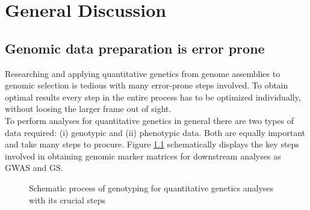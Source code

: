 \chapter{General Discussion} %
\label{Chapter6}
\section{Genomic data preparation is error prone}

Researching and applying quantitative genetics from genome assemblies to genomic selection
is tedious with many error-prone steps involved. To obtain optimal results every step in
the entire process has to be optimized individually, without loosing the larger frame out
of sight. \\
To perform analyses for quantitative genetics in general there are two types of data
required: (i) genotypic and (ii) phenotypic data. Both are equally important and take many
steps to procure. Figure \ref{fig:quan_flow} schematically displays the key steps involved
in obtaining genomic marker matrices for downstream analyses as GWAS and GS. 

\begin{figure}[H]
  \begin{center}
        \caption[Schematic process of genotyping for quantitative genetics]{Schematic process of genotyping for quantitative genetics analyses with its crucial steps}
      \end{center}
      \label{fig:quan_flow}
\end{figure}


